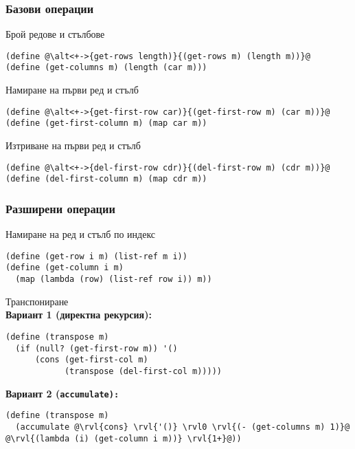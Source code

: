 \documentclass[alsotrans]{beamerswitch}
\begin{document}
\begin{frame}[fragile]
  \frametitle{Базови операции}

  Брой редове и стълбове
  \pause
  \onslide<+->
\begin{lstlisting}
(define @\alt<+->{get-rows length)}{(get-rows m) (length m))}@
(define (get-columns m) (length (car m)))
\end{lstlisting}
  \onslide<+->
  Намиране на първи ред и стълб
  \onslide<+->
\begin{lstlisting}
(define @\alt<+->{get-first-row car)}{(get-first-row m) (car m))}@
(define (get-first-column m) (map car m))
\end{lstlisting}
  \onslide<+->
  Изтриване на първи ред и стълб
  \onslide<+->
\begin{lstlisting}
(define @\alt<+->{del-first-row cdr)}{(del-first-row m) (cdr m))}@
(define (del-first-column m) (map cdr m))
\end{lstlisting}
\end{frame}

\begin{frame}[fragile]
  \frametitle{Разширени операции}

  Намиране на ред и стълб по индекс
  \pause
\begin{lstlisting}
(define (get-row i m) (list-ref m i))
(define (get-column i m)
  (map (lambda (row) (list-ref row i)) m))
\end{lstlisting}
  \pause
  Транспониране\\
  \pause
  \onslide<+->
  \textbf{Вариант 1 (директна рекурсия):}
\begin{lstlisting}
(define (transpose m)
  (if (null? (get-first-row m)) '()
      (cons (get-first-col m)
            (transpose (del-first-col m)))))
\end{lstlisting}
  \onslide<+->

 \textbf{Вариант 2 (\tt{accumulate}):}
  \begin{overprint}
\begin{lstlisting}
(define (transpose m)
  (accumulate @\rvl{cons} \rvl{'()} \rvl0 \rvl{(- (get-columns m) 1)}@ @\rvl{(lambda (i) (get-column i m))} \rvl{1+}@))
\end{lstlisting}
  \end{overprint}
\end{frame}
\end{document}
